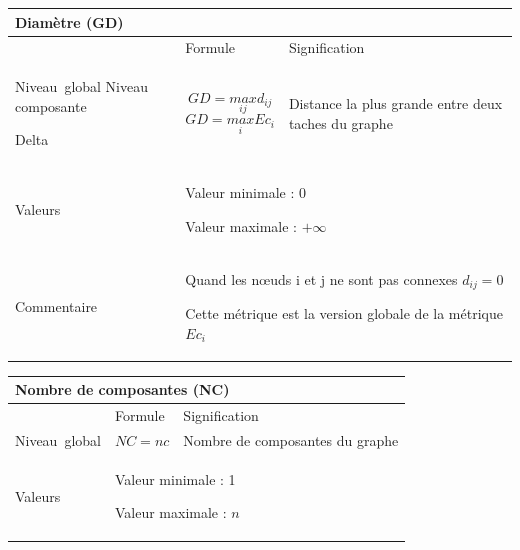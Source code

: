 \documentclass{article}
\begin{document}
\begin{table}[H]
\begin{tabular}{|m{3.24cm}|m{4.4810004cm}m{7.924cm}|}

\hline
\multicolumn{3}{|m{16.044998cm}|}{Diamètre (GD)}\\\hline
 &
\multicolumn{1}{m{4.4810004cm}|}{Formule} &
Signification\\\hline
Niveau~global  Niveau composante

Delta &
\multicolumn{1}{m{4.4810004cm}|}{\begin{equation*}
\mathit{GD}=\underset{\mathit{ij}}{\mathit{max}}{d}_{\mathit{ij}}
\end{equation*}
\begin{equation*}
\mathit{GD}=\underset{i}{\mathit{max}}{\mathit{Ec}}_{i}
\end{equation*}
} &
Distance la plus grande entre deux taches du graphe\\\hline
Valeurs &
\multicolumn{2}{m{12.6050005cm}|}{Valeur minimale : 0

Valeur maximale :  $+{\infty}$

}\\\hline
Commentaire &
\multicolumn{2}{m{12.6050005cm}|}{Quand les nœuds i et j ne sont pas connexes  ${d}_{\mathit{ij}}=0$

Cette métrique est la version globale de la métrique  ${\mathit{Ec}}_{i}$

}\\\hline
\end{tabular}
\end{table}
\begin{table}[H]
\raggedright
\begin{tabular}{|m{3.24cm}|m{4.4810004cm}m{7.924cm}|}

\hline
\multicolumn{3}{|m{16.044998cm}|}{Nombre de composantes (NC)}\\\hline
 &
\multicolumn{1}{m{4.4810004cm}|}{Formule} &
Signification\\\hline
Niveau~global 

 &
\multicolumn{1}{m{4.4810004cm}|}{\begin{equation*}
\mathit{NC}=\mathit{nc}
\end{equation*}
} &
Nombre de composantes du graphe\\\hline
Valeurs &
\multicolumn{2}{m{12.6050005cm}|}{Valeur minimale : 1

Valeur maximale :  $n$

}\\\hline
\end{tabular}
\end{table}
\end{document}
